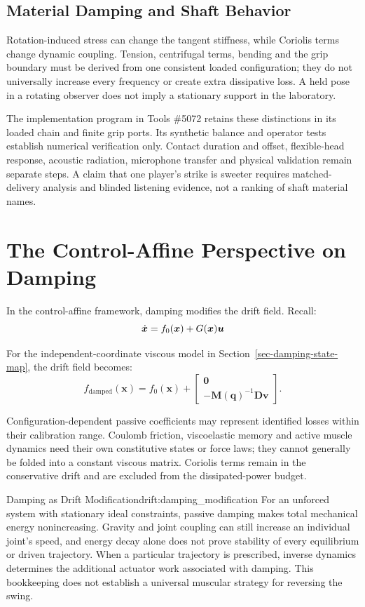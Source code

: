 \subsection{Material Damping and Shaft
Behavior}\label{material-damping-and-shaft-behavior}

Rotation-induced stress can change the tangent stiffness, while Coriolis terms change dynamic coupling. Tension, centrifugal terms, bending and the grip boundary must be derived from one consistent loaded configuration; they do not universally increase every frequency or create extra dissipative loss. A held pose in a rotating observer does not imply a stationary support in the laboratory.

The implementation program in Tools \#5072 retains these distinctions in its loaded chain and finite grip ports. Its synthetic balance and operator tests establish numerical verification only. Contact duration and offset, flexible-head response, acoustic radiation, microphone transfer and physical validation remain separate steps. A claim that one player's strike is sweeter requires matched-delivery analysis and blinded listening evidence, not a ranking of shaft material names. \section{The Control-Affine Perspective on Damping} \label{sec:damping_control_affine}


In the control-affine framework, damping modifies the drift field. Recall:
\[
\dot{\bm{x}} = f_0(\bm{x}) + G(\bm{x})\bm{u}
\]

For the independent-coordinate viscous model in Section~\ref{sec-damping-state-map}, the drift field becomes: \[
f_{\text{damped}}(\mathbf{x}) = f_0(\mathbf{x})
+\begin{bmatrix}\bm 0\\-\mathbf{M}(\mathbf{q})^{-1}\bm D\bm v\end{bmatrix}.
\]

Configuration-dependent passive coefficients may represent identified losses within their calibration range. Coulomb friction, viscoelastic memory and active muscle dynamics need their own constitutive states or force laws; they cannot generally be folded into a constant viscous matrix. Coriolis terms remain in the conservative drift and are excluded from the dissipated-power budget.
\begin{driftcontrol}{Damping as Drift Modification}{drift:damping_modification}
For an unforced system with stationary ideal constraints, passive damping makes total mechanical energy nonincreasing. Gravity and joint coupling can still increase an individual joint's speed, and energy decay alone does not prove stability of every equilibrium or driven trajectory. When a particular trajectory is prescribed, inverse dynamics determines the additional actuator work associated with damping. This bookkeeping does not establish a universal muscular strategy for reversing the swing.
\end{driftcontrol}

